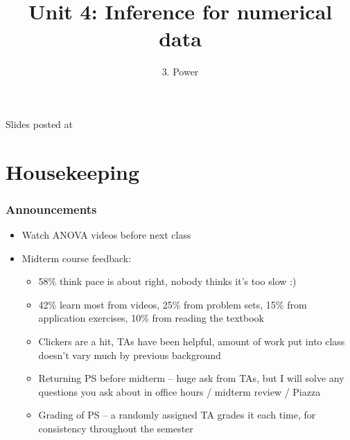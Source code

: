\documentclass[slidestop,compress,mathserif,12pt,t,professionalfonts,xcolor=table]{beamer}
\title{Unit 4: Inference for numerical data}
\subtitle{3. Power}
\author{\CourseName}
\date{}
\institute{\InstituteName}
\begin{document}



\begin{frame}[plain]

\titlepage

\vfill

{\scriptsize {} \hfill Slides posted at  \webURL{\CourseSite}}

\addtocounter{framenumber}{-1} 

\end{frame}


\section{Housekeeping}


\begin{frame}
\frametitle{Announcements}

\begin{itemize}

\item Watch ANOVA videos before next class

\item Midterm course feedback:
\begin{itemize}
\item 58\% think pace is about right, nobody thinks it's too slow :)
\item 42\% learn most from videos, 25\% from problem sets, 15\% from application exercises, 10\% from reading the textbook
\item Clickers are a hit, TAs have been helpful, amount of work put into class doesn't vary much by previous background
\item Returning PS before midterm -- huge ask from TAs, but I will solve any questions you ask about in office hours / midterm review / Piazza
\item Grading of PS -- a randomly assigned TA grades it each time, for consistency throughout the semester
\end{itemize}

\end{itemize}

\end{frame}
\end{document}
